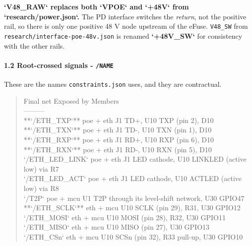 \documentclass[11pt,a4paper]{article}
\begin{document}
\textbf{`V48\_RAW` replaces both `VPOE` and `+48V` from `research/power.json`.} The PD interface switches the \emph{return}, not the positive rail, so there is only one positive 48 V node upstream of the eFuse. \texttt{V48\_SW} from \texttt{research/interface-poe-48v.json} is renamed \textbf{`+48V\_SW`} for consistency with the other rails.

\paragraph*{1.2 Root-crossed signals - \texttt{/NAME}}
These are the names \texttt{constraints.json} uses, and they are contractual.

\begin{quote}\small\ttfamily\raggedright
\textbar{} Final net \textbar{} Exposed by \textbar{} Members \textbar{}\\
\textbar{}---\textbar{}---\textbar{}---\textbar{}\\
\textbar{} {*}{*}`/ETH\_TXP`{*}{*} \textbar{} poe + eth \textbar{} J1 TD+, U10 TXP (pin 2), D10 \textbar{}\\
\textbar{} {*}{*}`/ETH\_TXN`{*}{*} \textbar{} poe + eth \textbar{} J1 TD-, U10 TXN (pin 1), D10 \textbar{}\\
\textbar{} {*}{*}`/ETH\_RXP`{*}{*} \textbar{} poe + eth \textbar{} J1 RD+, U10 RXP (pin 6), D10 \textbar{}\\
\textbar{} {*}{*}`/ETH\_RXN`{*}{*} \textbar{} poe + eth \textbar{} J1 RD-, U10 RXN (pin 5), D10 \textbar{}\\
\textbar{} `/ETH\_LED\_LINK` \textbar{} poe + eth \textbar{} J1 LED cathode, U10 LINKLED (active low) via R7 \textbar{}\\
\textbar{} `/ETH\_LED\_ACT` \textbar{} poe + eth \textbar{} J1 LED cathode, U10 ACTLED (active low) via R8 \textbar{}\\
\textbar{} `/T2P` \textbar{} poe + mcu \textbar{} U1 T2P through its level-shift network, U30 GPIO47 \textbar{}\\
\textbar{} {*}{*}`/ETH\_SCLK`{*}{*} \textbar{} eth + mcu \textbar{} U10 SCLK (pin 29), R31, U30 GPIO12 \textbar{}\\
\textbar{} `/ETH\_MOSI` \textbar{} eth + mcu \textbar{} U10 MOSI (pin 28), R32, U30 GPIO11 \textbar{}\\
\textbar{} `/ETH\_MISO` \textbar{} eth + mcu \textbar{} U10 MISO (pin 27), U30 GPIO13 \textbar{}\\
\textbar{} `/ETH\_CSn` \textbar{} eth + mcu \textbar{} U10 SCSn (pin 32), R33 pull-up, U30 GPIO10 \textbar{}\\

\end{quote}
\end{document}
